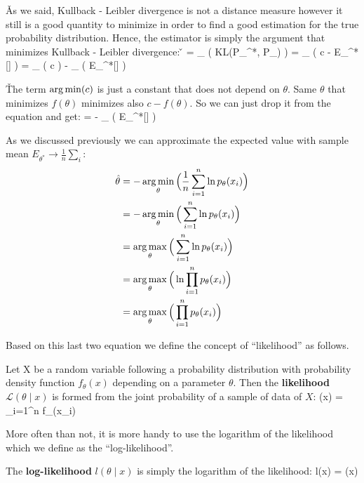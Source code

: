 \v

As we said, Kullback - Leibler divergence is not a distance measure however it still is a good quantity to minimize
in order to find a good estimation for the true probability distribution. Hence, the estimator is simply the argument
that minimizes Kullback - Leibler divergence: \v

\bse
\hat{\theta} = \argmin_{\theta} \Big( KL(P_{\theta^{*}}, P_{\theta}) \Big) =
\argmin_{\theta} \Big( c - E_{\theta^{*}}[] \Big) =
\argmin_{\theta} ( c ) - \argmin_{\theta} \Big( E_{\theta^{*}}[] \Big)
\ese

\v

The term $\operatorname*{arg\,min}(c)$ is just a constant that does not depend on $\theta$. Same $\theta$ that minimizes $f(\theta)$
minimizes also $c - f(\theta)$. So we can just drop it from the equation and get:
\bse
\hat{\theta} = - \argmin_{\theta} \Big( E_{\theta^{*}}[] \Big)
\ese

As we discussed previously we can approximate the expected value with sample mean $E_{\theta^{*}} \to \frac{1}{n}
\sum_{i}$:
\begingroup
\allowdisplaybreaks
\begin{align*}
\hat{\theta} &= - \operatorname*{arg\,min}_{\theta} \Big( \frac{1}{n} \sum_{i=1}^{n} \ln {p_{\theta}}(x_{i}) \Big) \\
&= - \operatorname*{arg\,min}_{\theta} \Big( \sum_{i=1}^{n} \ln {p_{\theta}}(x_{i}) \Big) \\
&= \operatorname*{arg\,max}_{\theta} \Big( \sum_{i=1}^{n} \ln {p_{\theta}}(x_{i}) \Big) \\
&= \operatorname*{arg\,max}_{\theta} \Big( \ln \prod_{i=1}^{n} {p_{\theta}}(x_{i}) \Big) \\
&= \operatorname*{arg\,max}_{\theta} \Big( \prod_{i=1}^{n} {p_{\theta}}(x_{i}) \Big)
\end{align*}
\endgroup

Based on this last two equation we define the concept of ``likelihood'' as follows.

\bd[Likelihood]
Let X be a random variable following a probability distribution with probability density function $f_{\theta}(x)$
depending on a parameter $\theta$. Then the \textbf{likelihood} $\mathcal {L} (\theta \mid x)$ is formed from the
joint probability of a sample of data of $X$:
\bse
{} (\theta \mid x) = \prod_{i=1}^{n} {f_{\theta}}(x_{i})
\ese
\ed

More often than not, it is more handy to use the logarithm of the likelihood which we define as the
``log-likelihood''.

The \textbf{log-likelihood} $l(\theta \mid x)$ is simply the logarithm of the likelihood:
\bse
l(\theta \mid x) = \ln {} (\theta \mid x)
\ese
\ed


